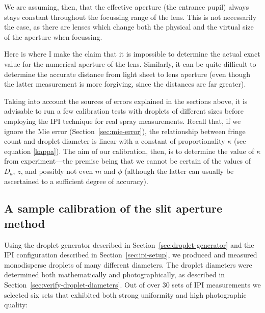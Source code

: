 \documentclass[11.5pt,oneside]{book}
\newcommand*{\secref}[1]{Section~\ref{#1}}
\begin{document}
We are assuming, then, that the effective aperture (the entrance pupil) always
stays constant throughout the focussing range of the lens. This is not
necessarily the case, as there are lenses which change both the physical and the
virtual size of the aperture when focussing.

Here is where I make the claim that it is impossible to determine the actual
exact value for the numerical aperture of the lens. Similarly, it can be quite
difficult to determine the accurate distance from light sheet to lens aperture
(even though the latter measurement is more forgiving, since the distances are
far greater).

Taking into account the sources of errors explained in the sections above, it is
advisable to run a few calibration tests with droplets of different sizes before
employing the IPI technique for real spray measurements. Recall that, if we
ignore the Mie error (\secref{sec:mie-error}), the relationship between fringe count and droplet diameter
is linear with a constant of proportionality $\kappa$ (see equation
\eqref{kappa}). The aim of our calibration, then, is to determine the value of
$\kappa$ from experiment---the premise being that we cannot be certain of the
values of $D_a$, $z$, and possibly not even $m$ and $\phi$ (although the latter
can usually be ascertained to a sufficient degree of accuracy).

\subsection{A sample calibration of the slit aperture method
\label{sec:ilids-calibration}}
Using the droplet generator described in \secref{sec:droplet-generator} and
the IPI configuration described in \secref{sec:ipi-setup}, we produced and
measured monodisperse droplets of many different diameters. The droplet
diameters were determined both mathematically and photographically, as described
in \secref{sec:verify-droplet-diameters}. Out of over 30 sets of IPI
measurements we selected six sets that exhibited both strong uniformity and
high photographic quality:
\end{document}
